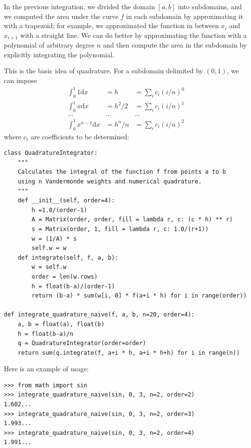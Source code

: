 \documentclass[justified, sixbynine]{tufte-book}
\def\ft{\small\tt}
\theoremstyle{plain}%
\newtheorem * {corollary}{Corollary}
\theoremstyle{definition}
\theoremstyle{remark}
\newtheorem * {remark}{Remark}
\newtheorem * {note}{Note}
\begin{document}
\begin{fullwidth}

In the previous integration, we divided the domain $[a, b]$ into subdomains, and we computed the area under the curve $f$ in each subdomain by approximating it with a trapezoid; for example, we approximated the function in between $x_i$ and $x_{i+1}$ with a straight line. We can do better by approximating the function with a polynomial of arbitrary degree $n$ and then compute the area in the subdomain by explicitly integrating the polynomial.

This is the basic idea of quadrature. For a subdomain delimited by $(0, 1)$, we can impose
\begin{eqnarray}
\int_0^1 1\textrm{d}x &= h &= \sum_i c_i (i/n)^0 \\
\int_0^1 x\textrm{d}x &= h^2/2 &= \sum_i c_i (i/n)^1 \\
... & ... & ... \\
\int_0^1 x^{n-1}\textrm{d}x &= h^n/n &= \sum_i c_i (i/n)^2
\end{eqnarray}
where $c_i$ are coefficients to be determined:


\begin{lstlisting}[caption={in file: {\ft nlib.py}}]
class QuadratureIntegrator:
    """
    Calculates the integral of the function f from points a to b
    using n Vandermonde weights and numerical quadrature.
    """
    def __init__(self, order=4):
        h =1.0/(order-1)
        A = Matrix(order, order, fill = lambda r, c: (c * h) ** r)
        s = Matrix(order, 1, fill = lambda r, c: 1.0/(r+1))
        w = (1/A) * s
        self.w = w
    def integrate(self, f, a, b):
        w = self.w
        order = len(w.rows)
        h = float(b-a)/(order-1)
        return (b-a) * sum(w[i, 0] * f(a+i * h) for i in range(order))

def integrate_quadrature_naive(f, a, b, n=20, order=4):
    a, b = float(a), float(b)
    h = float(b-a)/n
    q = QuadratureIntegrator(order=order)
    return sum(q.integrate(f, a+i * h, a+i * h+h) for i in range(n))
\end{lstlisting}

Here is an example of usage:

\begin{lstlisting}[caption={in file: {\ft nlib.py}}]
>>> from math import sin
>>> integrate_quadrature_naive(sin, 0, 3, n=2, order=2)
1.602...
>>> integrate_quadrature_naive(sin, 0, 3, n=2, order=3)
1.993...
>>> integrate_quadrature_naive(sin, 0, 3, n=2, order=4)
1.991...
\end{lstlisting}


\end{fullwidth}
\end{document}
